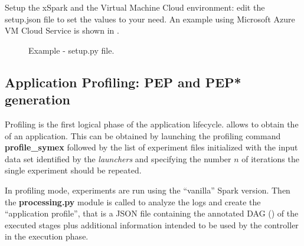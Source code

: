 Setup the xSpark and the Virtual Machine Cloud environment: edit the 
setup.json file to set the values to your need. An
example using Microsoft Azure VM Cloud Service is shown in .

\begin{figure}[t]
	\vspace{0.5cm}
	\centering
	\begin{minipage}{0,65\columnwidth}
		
		\vspace{0.5cm}  
		\caption{Example - setup.py file.}
		\label{fig:xspark_dagsymb_setup}
	\end{minipage}
\end{figure}
\vspace{0.5cm}  


\hypertarget{application-profiling}{%
\subsection{Application Profiling: PEP and PEP* generation}\label{application-profiling}}
Profiling is the first logical phase of the \tool application
lifecycle.  \tool allows to obtain the \model of an application. This can be obtained by launching the profiling command \textbf{profile\_symex} followed by the list of experiment files initialized with the input data set identified by the \dSymb \textit{launchers} and specifying the number $n$ of iterations the single experiment should be repeated. 

In profiling mode, experiments are run using the ``vanilla'' Spark version. Then the \textbf{processing.py} module is called to analyze the logs and create the ``application profile'', that is a JSON file containing the annotated DAG (\plan) of the executed stages plus additional information intended to be used by the controller in the execution phase.

